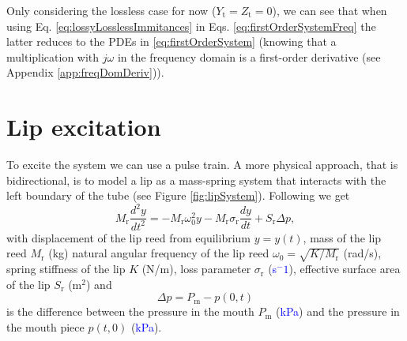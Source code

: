 \documentclass[dvipsnames]{article}
\def\SWcomment[#1]{\textcolor{blue}{#1}}
\begin{document}
Only considering the lossless case for now ($Y_\text{t} = Z_\text{t} = 0$), we can see that when using Eq. \eqref{eq:lossyLosslessImmitances} in Eqs. \eqref{eq:firstOrderSystemFreq} the latter reduces to the PDEs in \eqref{eq:firstOrderSystem} (knowing that a multiplication with $j\omega$ in the frequency domain is a first-order derivative (see Appendix \ref{app:freqDomDeriv})).   

\section{Lip excitation}
To excite the system we can use a pulse train. A more physical approach, that is bidirectional, is to model a lip as a mass-spring system that interacts with the left boundary of the tube (see Figure \ref{fig:lipSystem}). Following \cite{Harrison2018} we get
\begin{equation}
    M_\text{r}\frac{d^2y}{dt^2} = -M_\text{r} \omega_0^2 y - M_\text{r} \sigma_\text{r} \frac{dy}{dt} + S_\text{r}\Delta p,
\end{equation}
with displacement of the lip reed from equilibrium $y = y(t)$, mass of the lip reed $M_\text{r}$ (kg) natural angular frequency of the lip reed $\omega_0 = \sqrt{K/M_\text{r}}$ (rad/s), spring stiffness of the lip $K$ (N/m), loss parameter $\sigma_\text{r}$ (\SWcomment[s$^{-1}$]), effective surface area of the lip $S_\text{r}$ (m$^2$) and 
\begin{equation}
    \Delta p = P_\text{m} - p(0,t)
\end{equation}
is the difference between the pressure in the mouth $P_\text{m}$ (\SWcomment[kPa]) and the pressure in the mouth piece $p(t,0)$ (\SWcomment[kPa]). 
\end{document}
